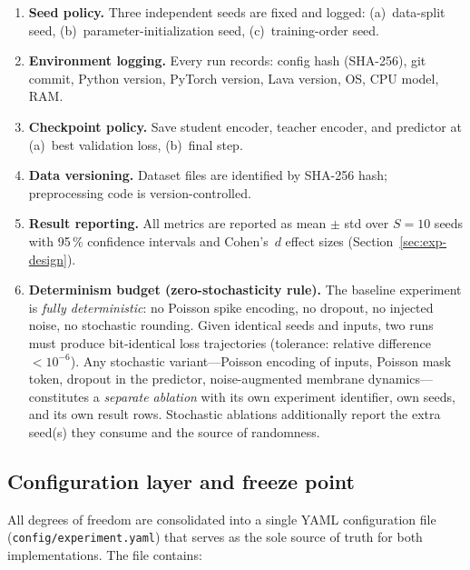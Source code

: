 \documentclass[11pt,a4paper]{article}
\begin{document}
\begin{enumerate}[label=\textbf{R\arabic*.},nosep]
\item \textbf{Seed policy.}
  Three independent seeds are fixed and logged:
  (a)~data-split seed,
  (b)~parameter-initialization seed,
  (c)~training-order seed.
\item \textbf{Environment logging.}
  Every run records: config hash (SHA-256), git commit, Python version,
  PyTorch version, Lava version, OS, CPU model, RAM.
\item \textbf{Checkpoint policy.}
  Save student encoder, teacher encoder, and predictor at
  (a)~best validation loss,
  (b)~final step.
\item \textbf{Data versioning.}
  Dataset files are identified by SHA-256 hash; preprocessing code is
  version-controlled.
\item \textbf{Result reporting.}
  All metrics are reported as mean $\pm$ std over $S = 10$ seeds
  with 95\,\% confidence intervals and Cohen's~$d$ effect sizes
  (Section~\ref{sec:exp-design}).
\item \textbf{Determinism budget (zero-stochasticity rule).}
  The baseline experiment is \emph{fully deterministic}: no Poisson
  spike encoding, no dropout, no injected noise, no stochastic
  rounding.  Given identical seeds and inputs, two runs must produce
  bit-identical loss trajectories (tolerance: relative difference
  $< 10^{-6}$).  Any stochastic variant---Poisson encoding of inputs,
  Poisson mask token, dropout in the predictor, noise-augmented
  membrane dynamics---constitutes a \emph{separate ablation} with its
  own experiment identifier, own seeds, and its own result rows.
  Stochastic ablations additionally report the extra seed(s) they
  consume and the source of randomness.
\end{enumerate}

\subsection{Configuration layer and freeze point}\label{sec:config}

All degrees of freedom are consolidated into a single YAML configuration
file (\texttt{config/experiment.yaml}) that serves as the sole source of
truth for both implementations.  The file contains:
\end{document}

